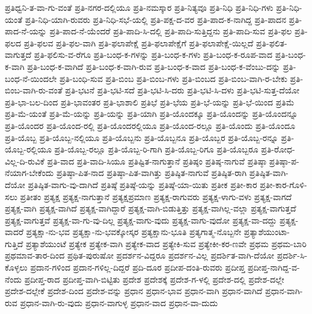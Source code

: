 ಪ್ರತಿಧ್ವನಿ-ತ-ವಾ-ಗು-ವಂತೆ
ಪ್ರತಿ-ನಗರ-ದಲ್ಲಿಯೂ
ಪ್ರತಿ-ನಮಸ್ಕಾರ
ಪ್ರತಿ-ನಿತ್ಯವೂ
ಪ್ರತಿ-ನಿಧಿ
ಪ್ರತಿ-ನಿಧಿ-ಗಳು
ಪ್ರತಿ-ನಿಧಿ-ಯಂತೆ
ಪ್ರತಿ-ನಿಧಿ-ಯಾಗಿ-ರುವರು
ಪ್ರತಿ-ನಿಧಿ-ಸಭೆ-ಯಲ್ಲಿ
ಪ್ರತಿ-ಪಕ್ಷ-ದ-ವರ
ಪ್ರತಿ-ಪಾದ-ಕ-ನಾಗಿದ್ದ
ಪ್ರತಿ-ಪಾದನ
ಪ್ರತಿ-ಪಾದ-ನೆ-ಯನ್ನು
ಪ್ರತಿ-ಪಾದ-ನೆ-ಯೆಂದರೆ
ಪ್ರತಿ-ಪಾದಿ-ಸಿ-ದಲ್ಲಿ
ಪ್ರತಿ-ಪಾದಿ-ಸುತ್ತಿದ್ದನು
ಪ್ರತಿ-ಪಾದಿ-ಸುವ
ಪ್ರತಿ-ಫಲ
ಪ್ರತಿ-ಫಲದ
ಪ್ರತಿ-ಫಲವ
ಪ್ರತಿ-ಫಲ-ವಾಗಿ
ಪ್ರತಿ-ಫಲಾಪೇಕ್ಷೆ
ಪ್ರತಿ-ಫಲಾಪೇಕ್ಷೆಗೆ
ಪ್ರತಿ-ಫಲಾಪೇಕ್ಷೆ-ಯಿಲ್ಲದೆ
ಪ್ರತಿ-ಫಲಿತ-ವಾಗುತ್ತದೆ
ಪ್ರತಿ-ಫಲಿಸು-ವ-ರೆಗೂ
ಪ್ರತಿ-ಬಂಧ-ಕ-ಗಳನ್ನು
ಪ್ರತಿ-ಬಂಧ-ಕ-ಗಳು
ಪ್ರತಿ-ಬಂಧ-ಕ-ರೂಪ-ವಾದ
ಪ್ರತಿ-ಬಂಧ-ಕ-ವಾಗಿ
ಪ್ರತಿ-ಬಂಧ-ಕ-ವಾಗಿದೆ
ಪ್ರತಿ-ಬಂಧ-ಕ-ವಾಗಿ-ರುವ
ಪ್ರತಿ-ಬಂಧ-ಕ-ವಾದ
ಪ್ರತಿ-ಬಂಧ-ಕ-ವೆಂಬು-ದನ್ನು
ಪ್ರತಿ-ಬಂಧ-ನೆ-ಯಿಂದಲೇ
ಪ್ರತಿ-ಬಂಧಿ-ಸುವ
ಪ್ರತಿ-ಬಿಂಬ
ಪ್ರತಿ-ಬಿಂಬ-ಗಳು
ಪ್ರತಿ-ಬಿಂಬದ
ಪ್ರತಿ-ಬಿಂಬ-ವಾಗಿ-ರ-ಬೇಕು
ಪ್ರತಿ-ಬಿಂಬ-ವಾಗಿ-ರು-ವಂತೆ
ಪ್ರತಿ-ಭಟನೆ
ಪ್ರತಿ-ಭಟಿ-ಸದೆ
ಪ್ರತಿ-ಭಟಿ-ಸಿ-ದರು
ಪ್ರತಿ-ಭಟಿ-ಸಿ-ದಳು
ಪ್ರತಿ-ಭಟಿ-ಸುತ್ತ-ದೆಯೋ
ಪ್ರತಿ-ಭಾ-ಬಲ-ದಿಂದ
ಪ್ರತಿ-ಭಾವಂತರ
ಪ್ರತಿ-ಭಾಶಾಲಿ
ಪ್ರತಿಭೆ
ಪ್ರತಿ-ಭೆಯ
ಪ್ರತಿ-ಭೆ-ಯನ್ನು
ಪ್ರತಿ-ಭೆ-ಯಿಂದ
ಪ್ರತಿಮೆ
ಪ್ರತಿ-ಮೆ-ಯಂತೆ
ಪ್ರತಿ-ಮೆ-ಯನ್ನು
ಪ್ರತಿ-ಯನ್ನು
ಪ್ರತಿ-ಯಾಗಿ
ಪ್ರತಿ-ಯೊಂದಕ್ಕೂ
ಪ್ರತಿ-ಯೊಂದನ್ನು
ಪ್ರತಿ-ಯೊಂದನ್ನೂ
ಪ್ರತಿ-ಯೊಂದರ
ಪ್ರತಿ-ಯೊಂದ-ರಲ್ಲಿ
ಪ್ರತಿ-ಯೊಂದರಲ್ಲಿಯೂ
ಪ್ರತಿ-ಯೊಂದ-ರಲ್ಲೂ
ಪ್ರತಿ-ಯೊಂದು
ಪ್ರತಿ-ಯೊಂದೂ
ಪ್ರತಿ-ಯೊಬ್ಬ
ಪ್ರತಿ-ಯೊಬ್ಬ-ನಲ್ಲಿಯೂ
ಪ್ರತಿ-ಯೊಬ್ಬನು
ಪ್ರತಿ-ಯೊಬ್ಬನೂ
ಪ್ರತಿ-ಯೊಬ್ಬರ
ಪ್ರತಿ-ಯೊಬ್ಬ-ರನ್ನೂ
ಪ್ರತಿ-ಯೊಬ್ಬ-ರಲ್ಲಿಯೂ
ಪ್ರತಿ-ಯೊಬ್ಬ-ರಲ್ಲೂ
ಪ್ರತಿ-ಯೊಬ್ಬ-ರಿ-ಗಾಗಿ
ಪ್ರತಿ-ಯೊಬ್ಬ-ರಿಗೂ
ಪ್ರತಿ-ಯೊಬ್ಬರೂ
ಪ್ರತಿ-ರೋಧ-ವಿಲ್ಲ-ದಿ-ರುವಿಕೆ
ಪ್ರತಿ-ವಾದ
ಪ್ರತಿ-ವಾದಿ-ಸಿಯೂ
ಪ್ರತಿಷ್ಟಿತ-ನಾಗುತ್ತಾನೆ
ಪ್ರತಿಷ್ಠಂ
ಪ್ರತಿಷ್ಠ-ನಾಗುವೆ
ಪ್ರತಿಷ್ಠಾ
ಪ್ರತಿಷ್ಠಾ-ಪ-ನೆಯಾಗ-ಬೇಕೆಂದು
ಪ್ರತಿಷ್ಠಾ-ಪಿತ-ನಾದ
ಪ್ರತಿಷ್ಠಾ-ಪಿತ-ವಾಗಿತ್ತು
ಪ್ರತಿಷ್ಠಿತ-ನಾಗುವೆ
ಪ್ರತಿಷ್ಠಿತ-ರಾಗಿ
ಪ್ರತಿಷ್ಠಿತ-ವಾಗಿ-ದೆಯೋ
ಪ್ರತಿಷ್ಠಿತ-ವಾಗು-ವು-ದಾಗಿದೆ
ಪ್ರತಿಷ್ಠೆ
ಪ್ರತಿಷ್ಠೆ-ಯನ್ನು
ಪ್ರತಿಷ್ಠೆ-ಯಾ-ಯಿತು
ಪ್ರತೀಕ
ಪ್ರತೀ-ಕಾರ
ಪ್ರತೀ-ಕಾರ-ಗೊಳಿ-ಸಲು
ಪ್ರತೀತಂ
ಪ್ರತ್ಯಕ್ಷ
ಪ್ರತ್ಯಕ್ಷ-ನಾಗುತ್ತಾನೆ
ಪ್ರತ್ಯಕ್ಷಪ್ರಮಾಣ
ಪ್ರತ್ಯಕ್ಷ-ರಾಗುವರು
ಪ್ರತ್ಯಕ್ಷ-ಳಾಗು-ವಳು
ಪ್ರತ್ಯಕ್ಷ-ವಾಗದೆ
ಪ್ರತ್ಯಕ್ಷ-ವಾಗಿ
ಪ್ರತ್ಯಕ್ಷ-ವಾಗಿದೆ
ಪ್ರತ್ಯಕ್ಷ-ವಾಗಿದ್ದಾರೆ
ಪ್ರತ್ಯಕ್ಷ-ವಾಗಿ-ಬಿಡುತ್ತಿತ್ತು
ಪ್ರತ್ಯಕ್ಷ-ವಾಗಿಲ್ಲ-ವಲ್ಲಾ
ಪ್ರತ್ಯಕ್ಷ-ವಾಗುತ್ತದೆ
ಪ್ರತ್ಯಕ್ಷ-ವಾಗುತ್ತವೆ
ಪ್ರತ್ಯಕ್ಷ-ವಾ-ಗು-ವು-ದಿಲ್ಲ
ಪ್ರತ್ಯಕ್ಷ-ವಾಗು-ವುದು
ಪ್ರತ್ಯಕ್ಷ-ವಾಗು-ವುದೋ
ಪ್ರತ್ಯಕ್ಷ-ವಾ-ದದ್ದು
ಪ್ರತ್ಯಕ್ಷ-ವಾದರೆ
ಪ್ರತ್ಯಕ್ಷಾ-ನು-ಭವ
ಪ್ರತ್ಯಕ್ಷಾ-ನು-ಭವಕ್ಕೋಸ್ಕರ
ಪ್ರತ್ಯಕ್ಷಾನು-ಭೂತಿ
ಪ್ರತ್ಯಗಾತ್ಮ-ನೊಬ್ಬನೇ
ಪ್ರತ್ಯಾಶೆಯುಂಟಾ-ಗುತ್ತಿದೆ
ಪ್ರತ್ಯಾಶೆಯುಂಟೆ
ಪ್ರತ್ಯೇಕ
ಪ್ರತ್ಯೇಕ-ವಾಗಿ
ಪ್ರತ್ಯೇಕ-ವಾದ
ಪ್ರತ್ಯೇಕಿ-ಸುವ
ಪ್ರತ್ಯೇಕೀ-ಕರ-ಣವೇ
ಪ್ರಥಮ
ಪ್ರಥಮ-ಬಾರಿ
ಪ್ರಥಮಾವ-ತಾರ-ದಿಂದ
ಪ್ರಥಿತ-ಪುರುಷೋ
ಪ್ರದರ್ಶನ-ವಿದ್ದರೂ
ಪ್ರದರ್ಶನ-ವಿಲ್ಲ
ಪ್ರದರ್ಶಿತ-ವಾಗಿ-ದೆಯೋ
ಪ್ರದರ್ಶಿ-ಸಿ-ಕೊಳ್ಳಲು
ಪ್ರದಾನ-ಗಳಿಂದ
ಪ್ರದಾನ-ಗಳಿಲ್ಲ-ದಿದ್ದರೆ
ಪ್ರದಿ-ದೂರ
ಪ್ರದೀಪ-ದಂತಿ-ರುವರು
ಪ್ರದೀಪ್ತ
ಪ್ರದೀಪ್ತ-ನಾಗಿದ್ದ-ವ-ನೆಂದು
ಪ್ರದೀಪ್ತ-ರಾದ
ಪ್ರದೀಪ್ತ-ವಾಗಿ-ಬಿಟ್ಟಿತು
ಪ್ರದೇಶ
ಪ್ರದೇಶಕ್ಕೆ
ಪ್ರದೇಶ-ಗ-ಳಲ್ಲಿ
ಪ್ರದೇಶ-ದಲ್ಲಿ
ಪ್ರದೇಶ-ದಲ್ಲೇ
ಪ್ರದೇಶ-ದಲ್ಲೇಕೆ
ಪ್ರದೇಶ-ದಿಂದ
ಪ್ರದೇಶ-ವನ್ನು
ಪ್ರಧಾನ
ಪ್ರಧಾನ-ಭಾವ
ಪ್ರಧಾನ-ವಾಗಿ
ಪ್ರಧಾನ-ವಾಗಿದೆ
ಪ್ರಧಾನ-ವಾಗಿ-ರುವ
ಪ್ರಧಾನ-ವಾಗಿ-ರು-ವುದು
ಪ್ರಧಾನ-ವಾಗುಳ್ಳ
ಪ್ರಧಾನ-ವಾದ
ಪ್ರಧಾನ-ವಾ-ದುದು
